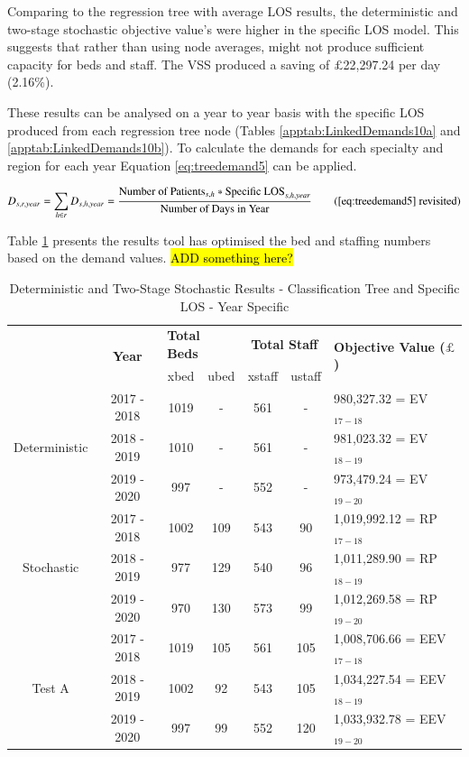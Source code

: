 \documentclass[../thesis.tex]{subfiles}
\begin{document}
Comparing to the regression tree with average LOS results, the deterministic and two-stage stochastic objective value's were higher in the specific LOS model. This suggests that rather than using node averages, might not produce sufficient capacity for beds and staff. The VSS produced a saving of $\pounds$22,297.24 per day (2.16\%). 

These results can be analysed on a year to year basis with the specific LOS produced from each regression tree node (Tables \ref{apptab:LinkedDemands10a} and \ref{apptab:LinkedDemands10b}). To calculate the demands for each specialty and region for each year Equation \eqref{eq:treedemand5} can be applied.


\begin{equation}
        D_{s,r,year} = \sum\limits_{h \in r} D_{s,h,year} = \frac{\text{Number of Patients}_{s,h}*{\text{Specific LOS}_{s,h,year}}}{{\text{Number of Days in Year}}} \tag{\ref{eq:treedemand5} revisited}
\end{equation}

Table \ref{tab:Results5} presents the results tool has optimised the bed and staffing numbers based on the demand values. \hl{ADD something here?} 

\begin{table}[h!]
    \centering
    \begin{tabular}{ccccccl}\toprule
 & \multirow{2}{*}{\textbf{Year}}& \multicolumn{2}{l}{\textbf{Total Beds}} & \multicolumn{2}{c}{\textbf{Total Staff}} & \multirow{2}{*}{\textbf{Objective Value ($\pounds$)}}\\ \cmidrule(lr){3-4} \cmidrule(lr){5-6}
&& xbed           & ubed          & xstaff         & ustaff         \\ \midrule
     \multirow{3}{*}{Deterministic} & 2017 - 2018 & 1019 & - & 561 & - & 980,327.32 = EV$_{17-18}$ \\ 
      & 2018 - 2019 &1010 & - &561 & - & 981,023.32 = EV$_{18-19}$ \\
      & 2019 - 2020 & 997 & - & 552 & - &  973,479.24 = EV$_{19-20}$\\\midrule
     \multirow{3}{*}{Stochastic} & 2017 - 2018 &1002 & 109 & 543 & 90 & 1,019,992.12 = RP$_{17-18}$ \\ 
      & 2018 - 2019 &977 & 129 &540 & 96& 1,011,289.90 = RP$_{18-19}$ \\
      & 2019 - 2020 & 970 & 130 & 573 &99 & 1,012,269.58 = RP$_{19-20}$\\ \midrule
      \multirow{3}{*}{Test A}& 2017 - 2018 &1019& 105&561&105&1,008,706.66 = EEV$_{17-18}$\\
      & 2018 - 2019 &1002& 92 & 543 & 105& 1,034,227.54 = EEV$_{18-19}$\\
      & 2019 - 2020 & 997 & 99 & 552 &120 &  1,033,932.78 = EEV$_{19-20}$\\\bottomrule      
    \end{tabular}
    \caption{Deterministic and Two-Stage Stochastic Results - Classification Tree and Specific LOS - Year Specific}
    \label{tab:Results5}
\end{table}
\end{document}
